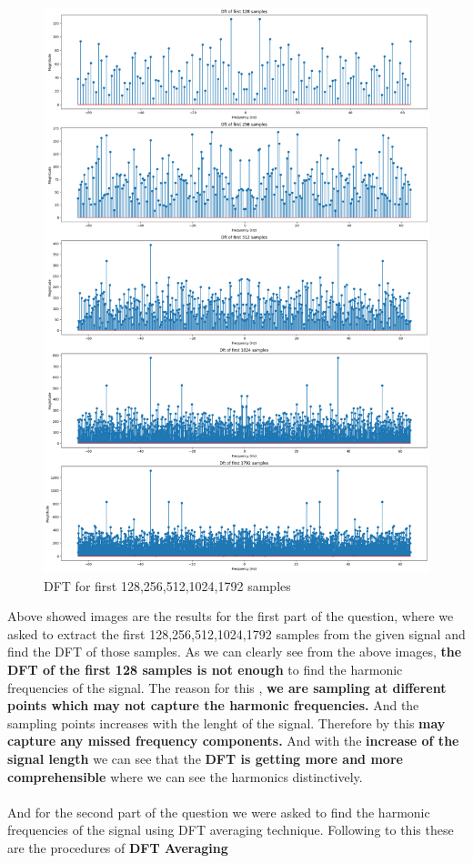\documentclass[11pt,a4paper]{article}
\begin{document}
{\begin{figure}[h]
    \centering
    \includegraphics[width=1.0\linewidth]{images/2.png}
    \caption{DFT for first 128,256,512,1024,1792 samples}
\end{figure}}

\newpage

Above showed images are the results for the first part of the question,
where we asked to extract the first 128,256,512,1024,1792 samples from the given signal and find the DFT of those samples.
As we can clearly see from the above images, \textbf{the DFT of the first 128 samples is not enough} to find the harmonic frequencies of the signal. The reason for this , \textbf{we are sampling at different points which may not capture the harmonic frequencies.} And the sampling points increases with the lenght of the signal. Therefore by this \textbf{may capture any missed frequency components.}
And with the \textbf{increase of the signal length} we can see that the \textbf{DFT is getting more and more comprehensible} where we can see the harmonics distinctively.\\
\\
And for the second part of the question we were asked to find the harmonic frequencies of the signal using DFT averaging technique.
Following to this these are the procedures of \textbf{DFT Averaging}
\end{document}
